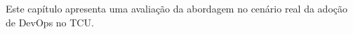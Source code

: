 Este capítulo apresenta uma avaliação da abordagem no cenário real da adoção
de DevOps no \acrshort{TCU}.
